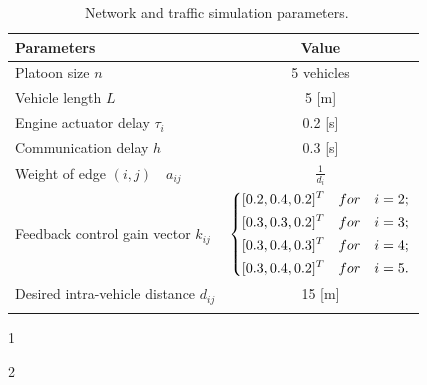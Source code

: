 \documentclass[a4paper]{cas-sc}
\begin{document}
\begin{table}
  \centering

  \setlength{\abovecaptionskip}{0pt}
  \setlength{\belowcaptionskip}{10pt}%
  \begin{threeparttable}[b]
    \caption{~Network and traffic simulation parameters.}
    {\begin{tabular}{lc} \toprule
        Parameters                                         & Value                                         \\ \midrule
        Platoon size $n$                                   & 5 vehicles                                    \\
        Vehicle length $L$                                 & 5 [m]                                         \\
        Engine actuator delay $\tau_i$                     & 0.2 [s] \tnote{1}                             \\
        Communication delay $h$                            & 0.3 [s] \tnote{2}                             \\
        Weight of edge $\left( {i,j} \right) \quad a_{ij}$ & $\frac{1}{{{d_i}}}$                           \\
        Feedback control gain vector $k_{ij}$              & $\left\{ \begin{gathered}
            {[0.2,0.4,0.2]^T}\quad for \quad i = 2; \hfill \\
            {[0.3,0.3,0.2]^T}\quad for \quad i = 3; \hfill \\
            {[0.3,0.4,0.3]^T}\quad for \quad i = 4; \hfill \\
            {[0.3,0.4,0.2]^T}\quad for \quad i = 5. \hfill \\
          \end{gathered}  \right.$ \\
        Desired intra-vehicle distance $d_{ij}$            & 15 [m]                                        \\
        \bottomrule
        \label{table1}
      \end{tabular}}
    \begin{tablenotes}
      \item[1] \citep{Wang2018a,Zhou2020}
      \item[2] \citep{Abbas2018,Thota2019}
    \end{tablenotes}
  \end{threeparttable}
\end{table}
\end{document}
